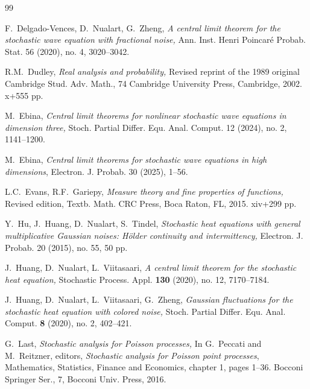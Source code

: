 \documentclass[letterpaper, 11pt,  reqno]{amsart}
\numberwithin{equation}{section}
\numberwithin{theorem}{section}
\begin{document}
\begin{thebibliography}{99}

F.~Delgado-Vences, D.~Nualart,  G.~Zheng,
{\it  A central limit theorem for the stochastic wave equation
with fractional noise,}
 Ann. Inst. Henri Poincar\'e Probab. Stat.  56
  (2020), no. 4, 3020--3042.


R.M.~Dudley,
{\it Real analysis and probability,}
Revised reprint of the 1989 original
Cambridge Stud. Adv. Math., 74
Cambridge University Press, Cambridge, 2002. x+555 pp.





 M.~Ebina,
 {\it Central limit theorems for nonlinear stochastic wave equations in dimension three,}
Stoch. Partial Differ. Equ. Anal. Comput. 12 (2024), no. 2, 1141--1200.


 
 M.~Ebina,
{\it  Central limit theorems for stochastic wave equations in high dimensions},
Electron. J. Probab. 30 (2025), 1--56.

 


L.C.~Evans,  R.F.~Gariepy,
{\it Measure theory and fine properties of functions,}
Revised edition,
Textb. Math. CRC Press, Boca Raton, FL, 2015. xiv+299 pp.
 

Y.~Hu,  J.~Huang, D.~Nualart, S.~Tindel,  
{\it Stochastic heat equations with general multiplicative Gaussian noises: 
H\"older continuity and intermittency,}
Electron. J. Probab. 20 (2015), no. 55, 50 pp.





J.~Huang,  D.~Nualart,  L.~Viitasaari,
{\it A central limit theorem for the stochastic heat equation,}
Stochastic Process. Appl. \textbf{130} (2020), no. 12, 7170--7184.

 





J.~Huang,  D.~Nualart, L.~Viitasaari,  G.~Zheng,
{\it Gaussian fluctuations for the stochastic heat equation with colored noise,}
Stoch. Partial Differ. Equ. Anal. Comput. \textbf{8} (2020), no. 2, 402--421.





G.~Last,
{\it  Stochastic analysis for Poisson processes,}
In G.~Peccati and M.~Reitzner, editors,
{\it Stochastic analysis for Poisson point processes},
Mathematics, Statistics, Finance
and Economics, chapter 1, pages 1--36.
Bocconi Springer Ser., 7,
Bocconi Univ. Press, 2016.
 



\end{thebibliography}
\end{document}
